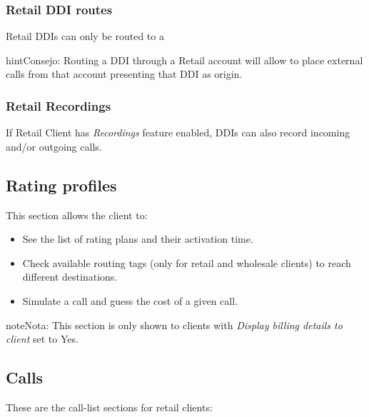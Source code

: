 \documentclass[letterpaper,10pt,spanish]{sphinxmanual}
\begin{document}
\subsubsection{Retail DDI routes}
\label{administration_portal/client/retail/ddis:retail-ddi-routes}
Retail DDIs can only be routed to a {\hyperref[administration_portal/client/retail/retail_accounts:retail\string-accounts]{}}

\begin{notice}{hint}{Consejo:}
Routing a DDI through a Retail account will allow to place external calls
from that account presenting that DDI as origin.
\end{notice}


\subsubsection{Retail Recordings}
\label{administration_portal/client/retail/ddis:retail-recordings}
If Retail Client has \emph{Recordings} feature enabled, DDIs can also record incoming and/or
outgoing calls.


\subsection{Rating profiles}
\label{administration_portal/client/retail/rating_profiles:rating-profiles}\label{administration_portal/client/retail/rating_profiles::doc}
This section allows the client to:
\begin{itemize}
\item {} 
See the list of rating plans and their activation time.

\item {} 
Check available routing tags (only for retail and wholesale clients) to reach different destinations.

\item {} 
Simulate a call and guess the cost of a given call.

\end{itemize}

\begin{notice}{note}{Nota:}
This section is only shown to clients with \emph{Display billing details to client} set to Yes.
\end{notice}


\subsection{Calls}
\label{administration_portal/client/retail/calls/index::doc}\label{administration_portal/client/retail/calls/index:calls}
These are the call-list sections for retail clients:
\end{document}
